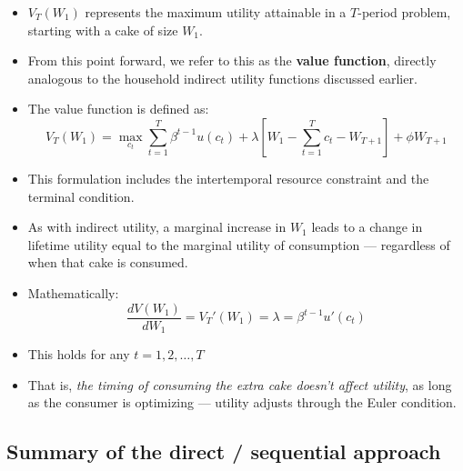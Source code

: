 \documentclass[12pt]{article}
\begin{document}
\begin{itemize}
    \item \( V_T(W_1) \) represents the maximum utility attainable in a \( T \)-period problem, starting with a cake of size \( W_1 \).
    
    \item From this point forward, we refer to this as the \textbf{value function}, directly analogous to the household indirect utility functions discussed earlier.

    \item The value function is defined as:
    \[
    V_T(W_1) = \max_{c_t} \sum_{t=1}^T \beta^{t-1} u(c_t) + \lambda \left[ W_1 - \sum_{t=1}^T c_t - W_{T+1} \right] + \phi W_{T+1}
    \]

    \item This formulation includes the intertemporal resource constraint and the terminal condition.

    \item As with indirect utility, a marginal increase in \( W_1 \) leads to a change in lifetime utility equal to the marginal utility of consumption — regardless of when that cake is consumed.

    \item Mathematically:
    \[
    \frac{dV(W_1)}{dW_1} = V_T'(W_1) = \lambda = \beta^{t-1} u'(c_t)
    \]

    \item This holds for any \( t = 1, 2, \dots, T \)

    \item That is, \textit{the timing of consuming the extra cake doesn’t affect utility}, as long as the consumer is optimizing — utility adjusts through the Euler condition.
\end{itemize}

\subsection*{\noindent\textbf{Summary of the direct / sequential approach}}
\end{document}
